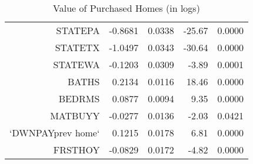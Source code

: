 \begin{table}[ht]
\begin{tabular}{rrrrr}
$$  STATEPA & -0.8681 & 0.0338 & -25.67 & 0.0000 \\ 
  STATETX & -1.0497 & 0.0343 & -30.64 & 0.0000 \\ 
  STATEWA & -0.1203 & 0.0309 & -3.89 & 0.0001 \\ 
  BATHS & 0.2134 & 0.0116 & 18.46 & 0.0000 \\ 
  BEDRMS & 0.0877 & 0.0094 & 9.35 & 0.0000 \\ 
  MATBUYY & -0.0277 & 0.0136 & -2.03 & 0.0421 \\ 
  `DWNPAYprev home` & 0.1215 & 0.0178 & 6.81 & 0.0000 \\ 
  FRSTHOY & -0.0829 & 0.0172 & -4.82 & 0.0000 \\ 
   \hline
\end{tabular}
\caption{Value of Purchased Homes (in logs)} 
\label{tab:reg1_fdr}
\end{table}
